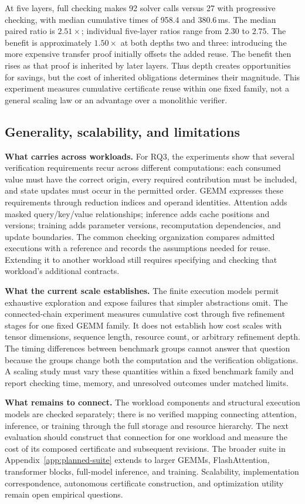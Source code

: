 \documentclass[11pt]{article}
\begin{document}
At five layers, full checking makes 92 solver calls versus 27 with progressive checking, with median cumulative times of 958.4 and 380.6\,ms. The median paired ratio is $2.51\times$; individual five-layer ratios range from $2.30$ to $2.75$. The benefit is approximately $1.50\times$ at both depths two and three: introducing the more expensive transfer proof initially offsets the added reuse. The benefit then rises as that proof is inherited by later layers. Thus depth creates opportunities for savings, but the cost of inherited obligations determines their magnitude. This experiment measures cumulative certificate reuse within one fixed family, not a general scaling law or an advantage over a monolithic verifier.

\subsection{Generality, scalability, and limitations}
\textbf{What carries across workloads.}
For RQ3, the experiments show that several verification requirements recur across different computations: each consumed value must have the correct origin, every required contribution must be included, and state updates must occur in the permitted order. GEMM expresses these requirements through reduction indices and operand identities. Attention adds masked query/key/value relationships; inference adds cache positions and versions; training adds parameter versions, recomputation dependencies, and update boundaries. The common checking organization compares admitted executions with a reference and records the assumptions needed for reuse. Extending it to another workload still requires specifying and checking that workload's additional contracts.

\textbf{What the current scale establishes.}
The finite execution models permit exhaustive exploration and expose failures that simpler abstractions omit. The connected-chain experiment measures cumulative cost through five refinement stages for one fixed GEMM family. It does not establish how cost scales with tensor dimensions, sequence length, resource count, or arbitrary refinement depth. The timing differences between benchmark groups cannot answer that question because the groups change both the computation and the verification obligations. A scaling study must vary these quantities within a fixed benchmark family and report checking time, memory, and unresolved outcomes under matched limits.

\textbf{What remains to connect.}
The workload components and structural execution models are checked separately; there is no verified mapping connecting attention, inference, or training through the full storage and resource hierarchy. The next evaluation should construct that connection for one workload and measure the cost of its composed certificate and subsequent revisions. The broader suite in Appendix~\ref{app:planned-suite} extends to larger GEMMs, FlashAttention, transformer blocks, full-model inference, and training. Scalability, implementation correspondence, autonomous certificate construction, and optimization utility remain open empirical questions.
\end{document}
